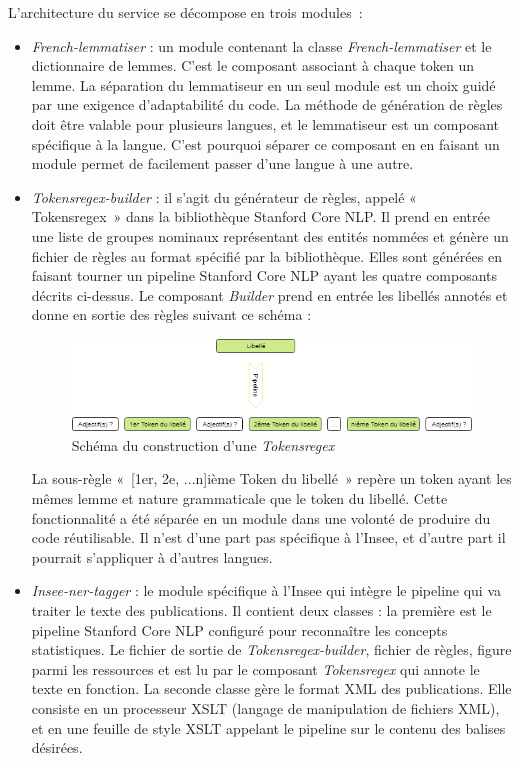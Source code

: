 L'architecture du service se décompose en trois modules~: 
\begin{itemize}
    \item \textit{French-lemmatiser} : un module contenant la classe \textit{French-lemmatiser} et le dictionnaire de lemmes. C'est le composant associant à chaque token un lemme. La séparation du lemmatiseur en un seul module est un choix guidé par une exigence d'adaptabilité du code. La méthode de génération de règles doit être valable pour plusieurs langues, et le lemmatiseur est un composant spécifique à la langue. C'est pourquoi séparer ce composant en en faisant un module permet de facilement passer d'une langue à une autre.
    \vspace{5pt}
    \item \textit{Tokensregex-builder} : il s'agit du générateur de règles, appelé «~ Tokensregex~» dans la bibliothèque Stanford Core NLP. Il prend en entrée une liste de groupes nominaux représentant des entités nommées et génère un fichier de règles au format spécifié par la bibliothèque. Elles sont générées en faisant tourner un pipeline Stanford Core NLP ayant les quatre composants décrits ci-dessus. Le composant \textit{Builder} prend en entrée les libellés annotés et donne en sortie des règles suivant ce schéma : 
    \vspace{10pt}
    \begin{figure}[H]
        \centering
        \includegraphics[scale=0.6]{images/Exemple-tokensregex.png}
        \caption{Schéma du construction d'une \textit{Tokensregex}}
        \label{fig:schema-tokensregex}
    \end{figure}
    \vspace{10pt}
    La sous-règle «~[1er, 2e, ...n]ième Token du libellé~» repère un token ayant les mêmes lemme et nature grammaticale que le token du libellé. Cette fonctionnalité a été séparée en un module dans une volonté de produire du code réutilisable. Il n'est d'une part pas spécifique à l'Insee, et d'autre part il pourrait s'appliquer à d'autres langues.
    \vspace{5pt}
    \item \textit{Insee-ner-tagger} : le module spécifique à l'Insee qui intègre le pipeline qui va traiter le texte des publications. Il contient deux classes : la première est le pipeline Stanford Core NLP configuré pour reconnaître les concepts statistiques. Le fichier de sortie de \textit{Tokensregex-builder}, fichier de règles, figure parmi les ressources et est lu par le composant \textit{Tokensregex} qui annote le texte en fonction. La seconde classe gère le format XML des publications. Elle consiste en un processeur XSLT (langage de manipulation de fichiers XML), et en une feuille de style XSLT appelant le pipeline sur le contenu des balises désirées.
    \newline
\end{itemize}

